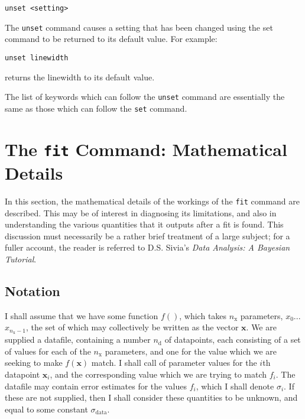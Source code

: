 \documentclass[a4paper,onecolumn,11pt]{book}
\begin{document}
\begin{verbatim}
unset <setting>
\end{verbatim}

The {\tt unset} command causes a setting that has been changed using the set
command to be returned to its default value.  For example:

\begin{verbatim}
unset linewidth
\end{verbatim}

\noindent returns the linewidth to its default value.

The list of keywords which can follow the {\tt unset} command are essentially
the same as those which can follow the {\tt set} command.

\chapter{The \texttt{fit} Command: Mathematical Details}
\label{fit_math}

In this section, the mathematical details of the workings of the \texttt{fit}
command are described. This may be of interest in diagnosing its limitations,
and also in understanding the various quantities that it outputs after a fit is
found. This discussion must necessarily be a rather brief treatment of a large
subject; for a fuller account, the reader is referred to D.S. Sivia's
\textit{Data Analysis: A Bayesian Tutorial}.

\section{Notation}
\label{bayes_notation}

I shall assume that we have some function $f()$, which takes $n_\mathrm{x}$
parameters, $x_0$...$x_{n_\mathrm{x}-1}$, the set of which may collectively be
written as the vector $\mathbf{x}$. We are supplied a datafile, containing a
number $n_\mathrm{d}$ of datapoints, each consisting of a set of values for
each of the $n_\mathrm{x}$ parameters, and one for the value which we are
seeking to make $f(\mathbf{x})$ match. I shall call of parameter values for the
$i$th datapoint $\mathbf{x}_i$, and the corresponding value which we are trying
to match $f_i$. The datafile may contain error estimates for the values $f_i$,
which I shall denote $\sigma_i$. If these are not supplied, then I shall
consider these quantities to be unknown, and equal to some constant
$\sigma_\mathrm{data}$.
\end{document}
